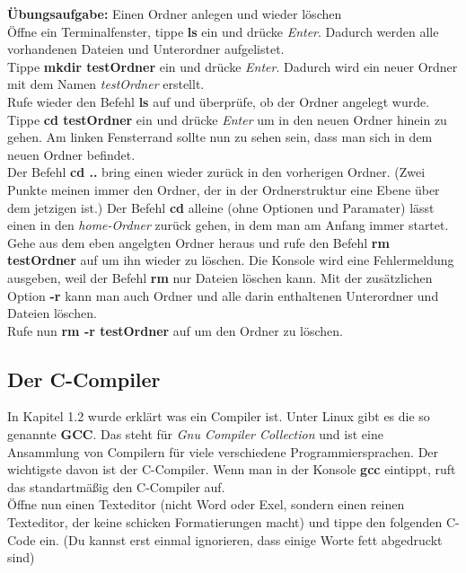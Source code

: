 \documentclass[c_worksheet.tex]{subfiles}
\begin{document}
\textbf{Übungsaufgabe:} Einen Ordner anlegen und wieder löschen\\
Öffne ein Terminalfenster, tippe \textbf{ls} ein und drücke \textit{Enter}. Dadurch werden alle vorhandenen Dateien und Unterordner aufgelistet.\\
Tippe \textbf{mkdir testOrdner} ein und drücke \textit{Enter}. Dadurch wird ein neuer Ordner mit dem Namen \textit{testOrdner} erstellt.\\
Rufe wieder den Befehl \textbf{ls} auf und überprüfe, ob der Ordner angelegt wurde.\\
Tippe \textbf{cd testOrdner} ein und drücke \textit{Enter} um in den neuen Ordner hinein zu gehen. Am linken Fensterrand sollte nun zu sehen sein, dass man sich in dem neuen Ordner befindet.\\
Der Befehl \textbf{cd ..} bring einen wieder zurück in den vorherigen Ordner. (Zwei Punkte meinen immer den Ordner, der in der Ordnerstruktur eine Ebene über dem jetzigen ist.) Der Befehl \textbf{cd} alleine (ohne Optionen und Paramater) lässt einen in den \textit{home-Ordner} zurück gehen, in dem man am Anfang immer startet.\\
Gehe aus dem eben angelgten Ordner heraus und rufe den Befehl \textbf{rm testOrdner} auf um ihn wieder zu löschen. Die Konsole wird eine Fehlermeldung ausgeben, weil der Befehl \textbf{rm} nur Dateien löschen kann. Mit der zusätzlichen Option \textbf{-r} kann man auch Ordner und alle darin enthaltenen Unterordner und Dateien löschen.\\
Rufe nun \textbf{rm -r testOrdner} auf um den Ordner zu löschen.

\newpage
\subsection{Der C-Compiler}

In Kapitel 1.2 wurde erklärt was ein Compiler ist. Unter Linux gibt es die so genannte \textbf{GCC}. Das steht für \textit{Gnu Compiler Collection} und ist eine Ansammlung von Compilern für viele verschiedene Programmiersprachen. Der wichtigste davon ist der C-Compiler. Wenn man in der Konsole \textbf{gcc} eintippt, ruft das standartmäßig den C-Compiler auf.\\

Öffne nun einen Texteditor (nicht Word oder Exel, sondern einen reinen Texteditor, der keine schicken Formatierungen macht) und tippe den folgenden C-Code ein. (Du kannst erst einmal ignorieren, dass einige Worte fett abgedruckt sind)\\
\end{document}
